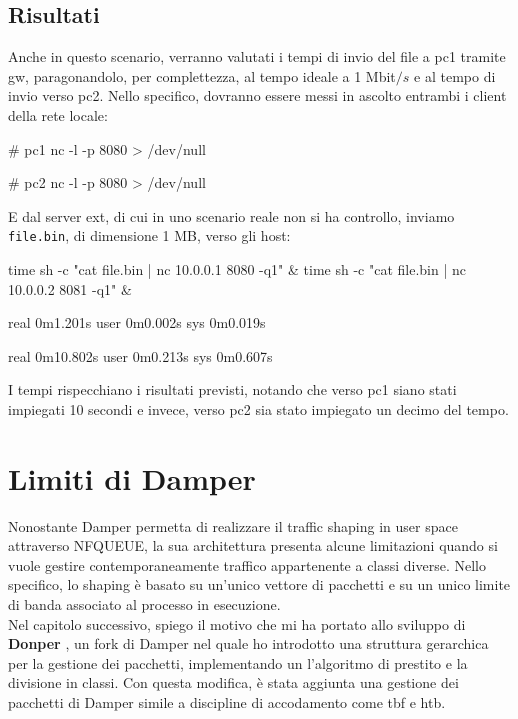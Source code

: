 \subsection{Risultati}
Anche in questo scenario, verranno valutati i tempi di invio del file a pc1 tramite gw, paragonandolo, per complettezza, al tempo ideale a 1 Mbit$/s$ e al tempo di invio verso pc2.
Nello specifico, dovranno essere messi in ascolto entrambi i client della rete locale:
\begin{bash}[Server nc]
# pc1
nc -l -p 8080 > /dev/null

# pc2
nc -l -p 8080 > /dev/null
\end{bash}
E dal server ext, di cui in uno scenario reale non si ha controllo, inviamo \texttt{file.bin}, di dimensione 1 MB, verso gli host:
\begin{bash}
time sh -c "cat file.bin | nc 10.0.0.1 8080 -q1" & time sh -c "cat file.bin | nc 10.0.0.2 8081 -q1" &
\end{bash}

\begin{bash}[Risultato]
real	0m1.201s
user	0m0.002s
sys	 0m0.019s

real	0m10.802s
user	0m0.213s
sys	 0m0.607s
\end{bash}
I tempi rispecchiano i risultati previsti, notando che verso pc1 siano stati impiegati 10 secondi e invece, verso pc2 sia stato impiegato un decimo del tempo.

\section{Limiti di Damper}
\label{sec:limiti}
Nonostante Damper permetta di realizzare il traffic shaping in user space attraverso NFQUEUE,
la sua architettura presenta alcune limitazioni quando si vuole gestire contemporaneamente traffico appartenente a classi diverse.
Nello specifico, lo shaping è basato su un'unico vettore di pacchetti e su un unico limite di banda associato al processo in esecuzione. \\ 
\vspace*{0.01\textheight}
Nel capitolo successivo, spiego il motivo che mi ha portato allo sviluppo di \textbf{Donper} \cite{donper}, un fork di Damper nel quale ho introdotto una struttura gerarchica per la gestione dei pacchetti, 
implementando un l'algoritmo di prestito e la divisione in classi. 
Con questa modifica, è stata aggiunta una gestione dei pacchetti di Damper simile a discipline di accodamento come tbf e htb.
